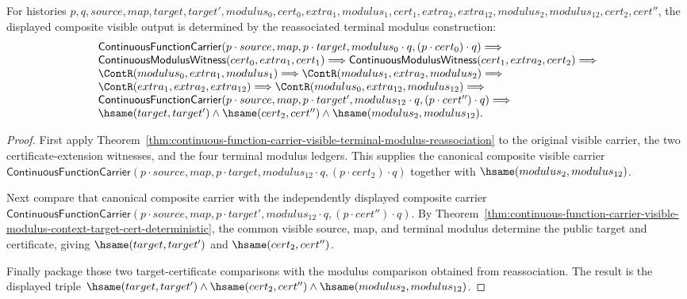 \begin{theorem}
\label{thm:continuous-function-carrier-visible-terminal-modulus-reassociation-output-determinacy}
For histories
$p,q,source,map,target,target',modulus_0,cert_0,extra_1,modulus_1,cert_1,
extra_2,extra_{12},modulus_2,modulus_{12},cert_2,cert''$, the displayed
composite visible output is determined by the reassociated terminal modulus
construction:
$$
\begin{array}{l}
\mathsf{ContinuousFunctionCarrier}(p\cdot source,map,p\cdot target,
modulus_0\cdot q,(p\cdot cert_0)\cdot q)
\Longrightarrow\\
\mathsf{ContinuousModulusWitness}(cert_0,extra_1,cert_1)
\Longrightarrow
\mathsf{ContinuousModulusWitness}(cert_1,extra_2,cert_2)
\Longrightarrow\\
\ContR(modulus_0,extra_1,modulus_1)
\Longrightarrow
\ContR(modulus_1,extra_2,modulus_2)
\Longrightarrow\\
\ContR(extra_1,extra_2,extra_{12})
\Longrightarrow
\ContR(modulus_0,extra_{12},modulus_{12})
\Longrightarrow\\
\mathsf{ContinuousFunctionCarrier}(p\cdot source,map,p\cdot target',
modulus_{12}\cdot q,(p\cdot cert'')\cdot q)
\Longrightarrow\\
\hsame(target,target')\land\hsame(cert_2,cert'')\land
\hsame(modulus_2,modulus_{12}).
\end{array}
$$
\end{theorem}
\begin{proof}
First apply
Theorem~\ref{thm:continuous-function-carrier-visible-terminal-modulus-reassociation}
to the original visible carrier, the two certificate-extension witnesses, and
the four terminal modulus ledgers. This supplies the canonical composite
visible carrier
$\mathsf{ContinuousFunctionCarrier}(p\cdot source,map,p\cdot target,
modulus_{12}\cdot q,(p\cdot cert_2)\cdot q)$ together with
$\hsame(modulus_2,modulus_{12})$.

Next compare that canonical composite carrier with the independently displayed
composite carrier
$\mathsf{ContinuousFunctionCarrier}(p\cdot source,map,p\cdot target',
modulus_{12}\cdot q,(p\cdot cert'')\cdot q)$. By
Theorem~\ref{thm:continuous-function-carrier-visible-modulus-context-target-cert-deterministic},
the common visible source, map, and terminal modulus determine the public
target and certificate, giving $\hsame(target,target')$ and
$\hsame(cert_2,cert'')$.

Finally package those two target-certificate comparisons with the modulus
comparison obtained from reassociation. The result is the displayed triple
$\hsame(target,target')\land\hsame(cert_2,cert'')\land
\hsame(modulus_2,modulus_{12})$.
\end{proof}

